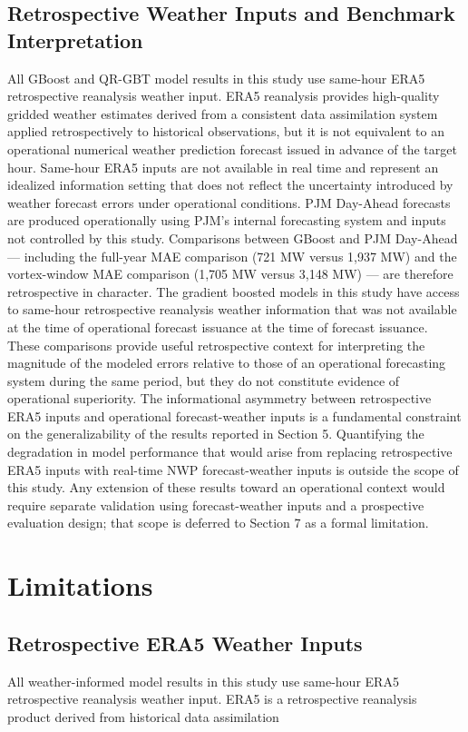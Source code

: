 \documentclass[12pt,a4paper]{article}
\begin{document}
\subsection{Retrospective Weather Inputs and Benchmark Interpretation}
All GBoost and QR-GBT model results in this study use same-hour ERA5 retrospective reanalysis weather input. ERA5 reanalysis provides high-quality gridded weather estimates derived from a consistent data assimilation system applied retrospectively to historical observations, but it is not equivalent to an operational numerical weather prediction forecast issued in advance of the target hour. Same-hour ERA5 inputs are not available in real time and represent an idealized information setting that does not reflect the uncertainty introduced by weather forecast errors under operational conditions.
PJM Day-Ahead forecasts are produced operationally using PJM's internal forecasting system and inputs not controlled by this study. Comparisons between GBoost and PJM Day-Ahead --- including the full-year MAE comparison (721 MW versus 1,937 MW) and the vortex-window MAE comparison (1,705 MW versus 3,148 MW) --- are therefore retrospective in character. The gradient boosted models in this study have access to same-hour retrospective reanalysis weather information that was not available at the time of operational forecast issuance at the time of forecast issuance. These comparisons provide useful retrospective context for interpreting the magnitude of the modeled errors relative to those of an operational forecasting system during the same period, but they do not constitute evidence of operational superiority.
The informational asymmetry between retrospective ERA5 inputs and operational forecast-weather inputs is a fundamental constraint on the generalizability of the results reported in Section 5. Quantifying the degradation in model performance that would arise from replacing retrospective ERA5 inputs with real-time NWP forecast-weather inputs is outside the scope of this study. Any extension of these results toward an operational context would require separate validation using forecast-weather inputs and a prospective evaluation design; that scope is deferred to Section 7 as a formal limitation.

\section{Limitations}
\subsection{Retrospective ERA5 Weather Inputs}
All weather-informed model results in this study use same-hour ERA5 retrospective reanalysis weather input. ERA5 is a retrospective reanalysis product derived from historical data assimilation
\end{document}
